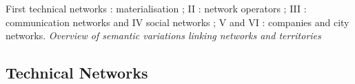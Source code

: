 First technical networks : materialisation ; II : network operators ; III : communication networks and IV social networks ; V and VI : companies and city networks.  \textit{Overview of semantic variations linking networks and territories}

\subsection{Technical Networks}


















